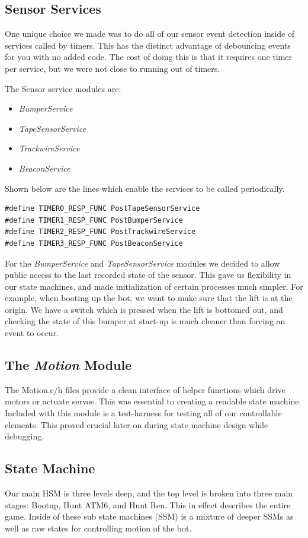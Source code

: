\documentclass[]{article}
\begin{document}
\subsection{Sensor Services}
One unique choice we made was to do all of our sensor event detection inside of services called by timers. This has the distinct advantage of debouncing events for you with no added code. The cost of doing this is that it requires one timer per service, but we were not close to running out of timers. 

The Sensor service modules are:
\begin{itemize}
    \item \textit{BumperService}
    \item \textit{TapeSensorService}
    \item \textit{TrackwireService}
    \item \textit{BeaconService}
\end{itemize}

Shown below are the lines which enable the services to be called periodically.
\begin{lstlisting}
#define TIMER0_RESP_FUNC PostTapeSensorService 
#define TIMER1_RESP_FUNC PostBumperService
#define TIMER2_RESP_FUNC PostTrackwireService
#define TIMER3_RESP_FUNC PostBeaconService
\end{lstlisting}

For the \textit{BumperService} and \textit{TapeSensorService} modules we decided to allow public access to the last recorded state of the sensor. This gave us flexibility in our state machines, and made initialization of certain processes much simpler. For example, when booting up the bot, we want to make sure that the lift is at the origin. We have a switch which is pressed when the lift is bottomed out, and checking the state of this bumper at start-up is much cleaner than forcing an event to occur.

\subsection{The \textit{Motion} Module}
The Motion.c/h files provide a clean interface of helper functions which drive motors or actuate servos. This was essential to creating a readable state machine. Included with this module is a test-harness for testing all of our controllable elements. This proved crucial later on during state machine design while debugging.

\subsection{State Machine}
Our main HSM is three levels deep, and the top level is broken into three main stages: Bootup, Hunt ATM6, and Hunt Ren. This in effect describes the entire game. Inside of these sub state machines (SSM) is a mixture of deeper SSMs as well as raw states for controlling motion of the bot.
\end{document}
